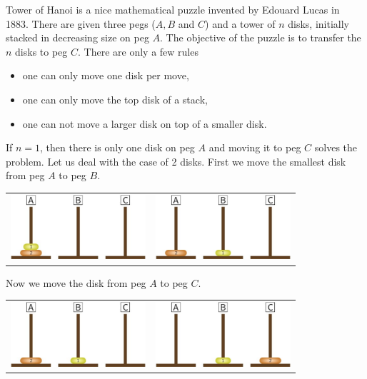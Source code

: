 Tower of Hanoi is a nice mathematical puzzle invented by Edouard Lucas in 1883. 
There are given three pegs ($A,B$ and $C$) and a tower of $n$ disks, initially stacked in decreasing size on
peg $A$. The objective of the puzzle is to transfer the $n$ disks to peg $C$. There are only a few rules
\begin{itemize}
\item one can only move one disk per move,
\item one can only move the top disk of a stack,
\item one can not move a larger disk on top of a smaller disk.
\end{itemize}
If $n=1$, then there is only one disk on peg $A$ and moving it to peg $C$ solves the problem.
Let us deal with the case of 2 disks. First we move the smallest disk from peg $A$ to peg $B$.
\begin{center}
\begin{tabular}{l|r}
\includegraphics[width=50mm]{./H21}
&
\includegraphics[width=50mm]{./H22}
\end{tabular}
\end{center}
Now we move the disk from peg $A$ to peg $C$.
\begin{center}
\begin{tabular}{l|r}
\includegraphics[width=50mm]{./H22}
&
\includegraphics[width=50mm]{./H23}
\end{tabular}
\end{center}
